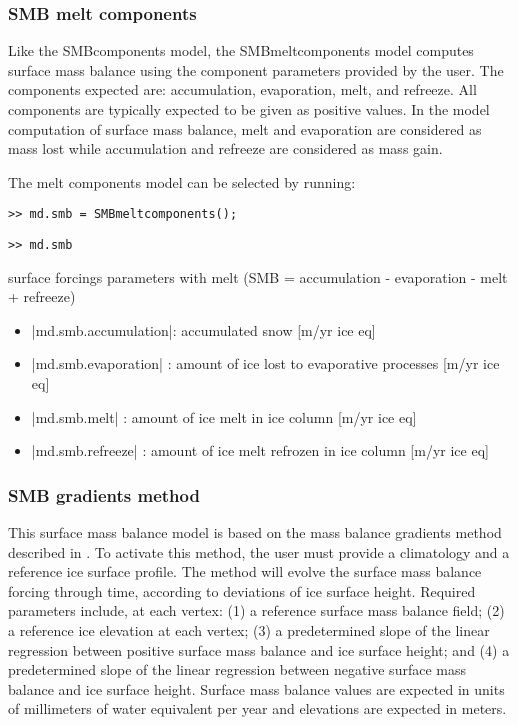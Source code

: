 \subsubsection{SMB melt components}
Like the SMBcomponents model, the SMBmeltcomponents model computes surface mass balance using the component parameters provided by the user. The components expected are: accumulation, evaporation, melt, and refreeze. All components are typically expected to be given as positive values.  In the model computation of surface mass balance, melt and evaporation are considered as mass lost while accumulation and refreeze are considered as mass gain.

The melt components model can be selected by running:
\begin{lstlisting}
>> md.smb = SMBmeltcomponents();
\end{lstlisting}
\begin{lstlisting}
>> md.smb
\end{lstlisting}
surface forcings parameters with melt (SMB = accumulation - evaporation - melt + refreeze)
\begin{itemize}
	\item \lstinlinebg|md.smb.accumulation|: accumulated snow [m/yr ice eq]
	\item \lstinlinebg|md.smb.evaporation| : amount of ice lost to evaporative processes [m/yr ice eq]
	\item \lstinlinebg|md.smb.melt|        : amount of ice melt in ice column [m/yr ice eq]
	\item \lstinlinebg|md.smb.refreeze|    : amount of ice melt refrozen in ice column [m/yr ice eq]
\end{itemize}

\subsubsection{SMB gradients method}
This surface mass balance model is based on the mass balance gradients method described in \cite{Helsen2012}. To activate this method, the user must provide a climatology and a reference ice surface profile. The method will evolve the surface mass balance forcing through time, according to deviations of ice surface height. Required parameters include, at each vertex: (1) a reference surface mass balance field; (2) a reference ice elevation at each vertex; (3) a predetermined slope of the linear regression between positive surface mass balance and ice surface height; and (4) a predetermined slope of the linear regression between negative surface mass balance and ice surface height. Surface mass balance values are expected in units of millimeters of water equivalent per year and elevations are expected in meters.

